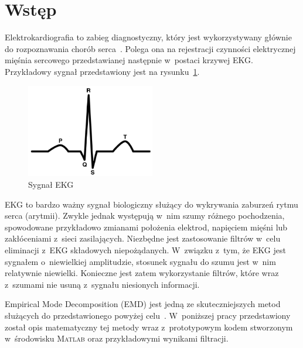 \section{Wstęp}
\indent

Elektrokardiografia to zabieg diagnostyczny, który jest wykorzystywany głównie
do rozpoznawania chorób serca~\cite{EKG-Wiki}. Polega ona na rejestracji
czynności elektrycznej mięśnia sercowego przedstawianej następnie w~postaci
krzywej EKG. Przykładowy sygnał przedstawiony jest na rysunku~\ref{fig:pqrst}.
\begin{figure}[!ht]
    \centering
    \includegraphics[width=0.5\textwidth]{../img/pqrst.png}
    \caption{Sygnał EKG}
    \label{fig:pqrst}
\end{figure}

EKG to bardzo ważny sygnał biologiczny służący do wykrywania zaburzeń rytmu
serca (arytmii). Zwykle jednak występują w~nim szumy różnego pochodzenia,
spowodowane przykładowo zmianami położenia elektrod, napięciem mięśni lub
zakłóceniami z~sieci zasilających. Niezbędne jest zastosowanie filtrów w~celu
eliminacji z~EKG składowych niepożądanych. W~związku z~tym, że EKG jest sygnałem
o~niewielkiej amplitudzie, stosunek sygnału do szumu jest w~nim relatywnie
niewielki. Konieczne jest zatem wykorzystanie filtrów, które wraz z~szumami nie
usuną z~sygnału niesionych informacji.

Empirical Mode Decomposition (EMD) jest jedną ze skuteczniejszych metod
służących do przedstawionego powyżej celu~\cite{ECG-EMD}. W~poniższej pracy
przedstawiony został opis matematyczny tej metody wraz z~prototypowym kodem
stworzonym w~środowisku \textsc{Matlab} oraz przykładowymi wynikami filtracji.
